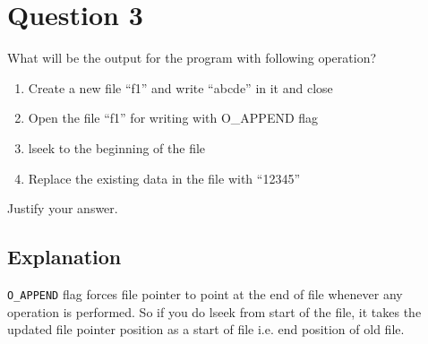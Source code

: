 \documentclass[main.tex]{subfiles}
\begin{document}
\section{Question 3}

What will be the output for the program with following operation?
\begin{enumerate}
  \item Create a new file “f1” and write “abcde” in it and close
  \item Open the file “f1” for writing with O\_APPEND flag
  \item lseek to the beginning of the file
  \item Replace the existing data in the file with “12345”
\end{enumerate}
Justify your answer.

\subsection{Explanation}
\texttt{O\_APPEND} flag forces file pointer to point at the end of file whenever
any operation is performed.  So if you do lseek from start of the file, it takes
the updated file pointer position as a start of file i.e. end position of old
file.


\end{document}
